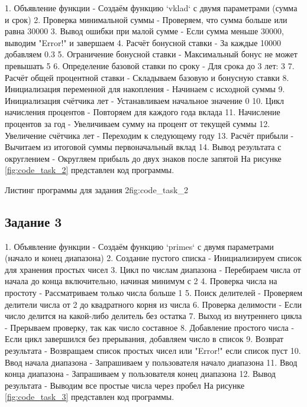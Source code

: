 \documentclass[]{vvsu}
\begin{document}
1. Объявление функции - Создаём функцию `vklad` с двумя параметрами (сумма и срок)  
2. Проверка минимальной суммы - Проверяем, что сумма больше или равна 30000  
3. Вывод ошибки при малой сумме - Если сумма меньше 30000, выводим "Error!" и завершаем  
4. Расчёт бонусной ставки - За каждые 10000 добавляем 0.3%
5. Ограничение бонусной ставки - Максимальный бонус не может превышать 5%
6. Определение базовой ставки по сроку - Для срока до 3 лет: 3%
7. Расчёт общей процентной ставки - Складываем базовую и бонусную ставки  
8. Инициализация переменной для накопления - Начинаем с исходной суммы  
9. Инициализация счётчика лет - Устанавливаем начальное значение 0  
10. Цикл начисления процентов - Повторяем для каждого года вклада  
11. Начисление процентов за год - Увеличиваем сумму на процент от текущей суммы  
12. Увеличение счётчика лет - Переходим к следующему году  
13. Расчёт прибыли - Вычитаем из итоговой суммы первоначальный вклад  
14. Вывод результата с округлением - Округляем прибыль до двух знаков после запятой На рисунке \ref{fig:code_task_2} представлен код программы.

\begin{vvsu_figure}{Листинг программы для задания 2}{fig:code_task_2}
  \begin{minipage}{.75\textwidth}
    
  \end{minipage}
\end{vvsu_figure}

\subsection{Задание 3}

1. Объявление функции - Создаём функцию `primes` с двумя параметрами (начало и конец диапазона)  
2. Создание пустого списка - Инициализируем список для хранения простых чисел  
3. Цикл по числам диапазона - Перебираем числа от начала до конца включительно, начиная минимум с 2  
4. Проверка числа на простоту - Рассматриваем только числа больше 1  
5. Поиск делителей - Проверяем делители числа от 2 до квадратного корня из числа  
6. Проверка делимости - Если число делится на какой-либо делитель без остатка  
7. Выход из внутреннего цикла - Прерываем проверку, так как число составное  
8. Добавление простого числа - Если цикл завершился без прерывания, добавляем число в список  
9. Возврат результата - Возвращаем список простых чисел или "Error!" если список пуст  
10. Ввод начала диапазона - Запрашиваем у пользователя начало диапазона  
11. Ввод конца диапазона - Запрашиваем у пользователя конец диапазона  
12. Вывод результата - Выводим все простые числа через пробел На рисунке \ref{fig:code_task_3} представлен код программы.
\end{document}

